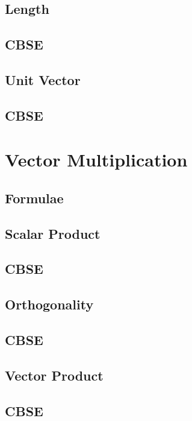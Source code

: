 \documentclass[journal]{IEEEtran}
\begin{document}
\subsection{Length}

\subsection{CBSE}

\subsection{Unit Vector}

\subsection{CBSE}

%
%
\newpage
\section{Vector Multiplication}
\subsection{Formulae}

\subsection{Scalar Product}

\subsection{CBSE}

\subsection{Orthogonality}

\subsection{CBSE}

\subsection{Vector Product}

\subsection{CBSE}

\end{document}

